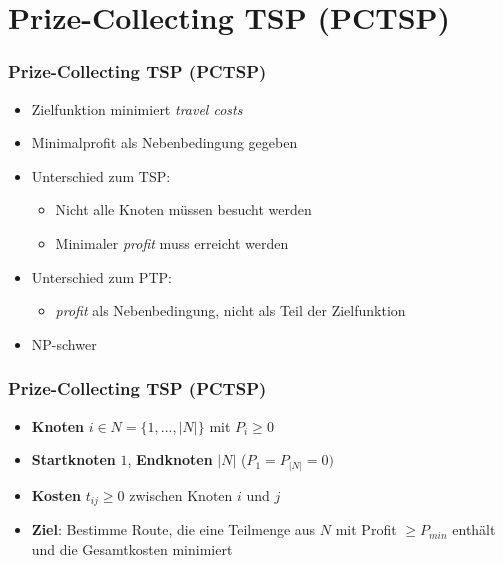 \documentclass{beamer}
\begin{document}
\section{Prize-Collecting \textsc{TSP} (\textsc{PCTSP})}

\begin{frame}
\frametitle{Prize-Collecting \textsc{TSP} (\textsc{PCTSP})}
\begin{itemize}
  \item Zielfunktion minimiert \textit{travel costs}
  \item Minimalprofit als Nebenbedingung gegeben
  \item Unterschied zum \textsc{TSP}: 
  \begin{itemize}
    \item Nicht alle Knoten müssen besucht werden
    \item Minimaler \textit{profit} muss erreicht werden
  \end{itemize}
  \item Unterschied zum \textsc{PTP}:
  \begin{itemize}
    \item \textit{profit} als Nebenbedingung, nicht als Teil der Zielfunktion
  \end{itemize}
  \item NP-schwer
\end{itemize}
\end{frame}

\begin{frame}
  \frametitle{Prize-Collecting \textsc{TSP} (\textsc{PCTSP})}
  \begin{itemize}
    \item \textbf{Knoten} $i \in N = \{1, ..., |N|\}$ mit $P_i \geq 0$
    \item \textbf{Startknoten} $1$, \textbf{Endknoten} $|N|$ ($P_1 = P_{|N|} = 0)$
    \item \textbf{Kosten} $t_{ij} \geq 0$ zwischen Knoten $i$ und $j$
    \item \textbf{Ziel}: Bestimme Route, die eine Teilmenge aus $N$ mit Profit $\geq P_{min}$ enthält
    und die Gesamtkosten minimiert
  \end{itemize}
\end{frame}
\end{document}
